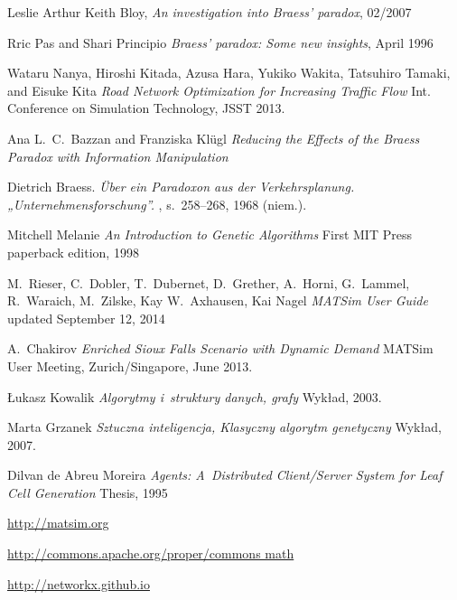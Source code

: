 \documentclass[twoside,12pt]{report}
\renewcommand{\bibname}{Bibliografia}
\begin{document}
\cleardoublepage
{}
\addcontentsline{toc}{chapter}{\bibname} 
\begin{thebibliography}{99}
	Leslie Arthur Keith Bloy, 
	\newblock \textit{An investigation into Braess’ paradox}, 02/2007

	Rric Pas and Shari Principio
	\newblock \textit{Braess’ paradox: Some new insights}, April 1996

	Wataru Nanya, Hiroshi Kitada, Azusa Hara, Yukiko Wakita, Tatsuhiro Tamaki, and Eisuke Kita
	\newblock \textit{Road Network Optimization for Increasing Traffic Flow}
	\newblock Int. Conference on Simulation Technology, JSST 2013.

	Ana L.~C.~Bazzan and Franziska Klügl
	\newblock \textit{Reducing the Effects of the Braess Paradox with Information Manipulation}

	Dietrich Braess. 
	\newblock \textit{Über ein Paradoxon aus der Verkehrsplanung. „Unternehmensforschung”.} 
	, s.~258–268, 1968 (niem.).

	Mitchell Melanie
	\newblock \textit{An Introduction to Genetic Algorithms}
	\newblock First MIT Press paperback edition, 1998

	M.~Rieser, C.~Dobler, T.~Dubernet, D.~Grether, A.~Horni, G.~Lammel, R.~Waraich, M.~Zilske, Kay W.~Axhausen, Kai Nagel
	\newblock \textit{MATSim User Guide}
	\newblock updated September 12, 2014

	A.~Chakirov
	\newblock \textit{Enriched Sioux Falls Scenario with Dynamic Demand}
	\newblock MATSim User Meeting, Zurich/Singapore, June 2013.
	
	Łukasz Kowalik
	\newblock \textit{Algorytmy i~struktury danych, grafy}
	\newblock Wykład, 2003.
	
	Marta Grzanek
	\newblock \textit{Sztuczna inteligencja, Klasyczny algorytm genetyczny}
	\newblock Wykład, 2007.
	
	Dilvan de Abreu Moreira
	\newblock \textit{Agents: A~Distributed Client/Server System for Leaf Cell Generation}
	\newblock Thesis, 1995
	
	\url{http://matsim.org}	

	\url{http://commons.apache.org/proper/commons math}
	
	\url{http://networkx.github.io}


\end{thebibliography}
\end{document}
